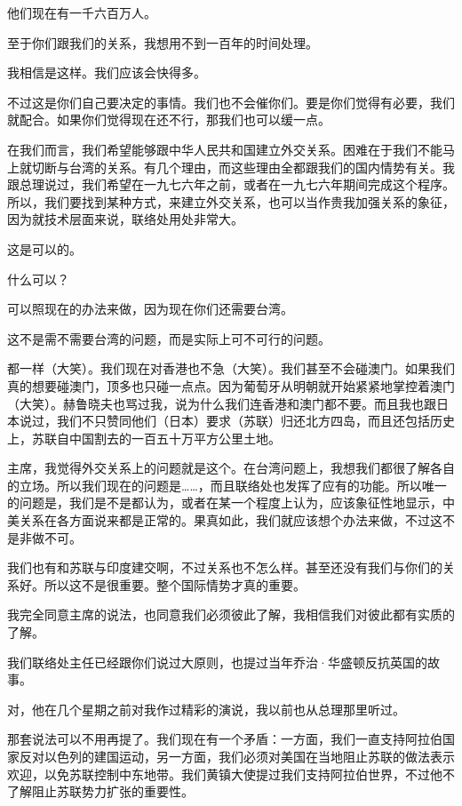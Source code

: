 他们现在有一千六百万人。

至于你们跟我们的关系，我想用不到一百年的时间处理。

我相信是这样。我们应该会快得多。

不过这是你们自己要决定的事情。我们也不会催你们。要是你们觉得有必要，我们就配合。如果你们觉得现在还不行，那我们也可以缓一点。

在我们而言，我们希望能够跟中华人民共和国建立外交关系。困难在于我们不能马上就切断与台湾的关系。有几个理由，而这些理由全都跟我们的国内情势有关。我跟总理说过，我们希望在一九七六年之前，或者在一九七六年期间完成这个程序。所以，我们要找到某种方式，来建立外交关系，也可以当作贵我加强关系的象征，因为就技术层面来说，联络处用处非常大。

这是可以的。

什么可以？

可以照现在的办法来做，因为现在你们还需要台湾。

这不是需不需要台湾的问题，而是实际上可不可行的问题。

都一样（大笑）。我们现在对香港也不急（大笑）。我们甚至不会碰澳门。如果我们真的想要碰澳门，顶多也只碰一点点。因为葡萄牙从明朝就开始紧紧地掌控着澳门（大笑）。赫鲁晓夫也骂过我，说为什么我们连香港和澳门都不要。而且我也跟日本说过，我们不只赞同他们（日本）要求（苏联）归还北方四岛，而且还包括历史上，苏联自中国割去的一百五十万平方公里土地。

主席，我觉得外交关系上的问题就是这个。在台湾问题上，我想我们都很了解各自的立场。所以我们现在的问题是……，而且联络处也发挥了应有的功能。所以唯一的问题是，我们是不是都认为，或者在某一个程度上认为，应该象征性地显示，中美关系在各方面说来都是正常的。果真如此，我们就应该想个办法来做，不过这不是非做不可。

我们也有和苏联与印度建交啊，不过关系也不怎么样。甚至还没有我们与你们的关系好。所以这不是很重要。整个国际情势才真的重要。

我完全同意主席的说法，也同意我们必须彼此了解，我相信我们对彼此都有实质的了解。

我们联络处主任已经跟你们说过大原则，也提过当年乔治·华盛顿反抗英国的故事。

对，他在几个星期之前对我作过精彩的演说，我以前也从总理那里听过。

那套说法可以不用再提了。我们现在有一个矛盾：一方面，我们一直支持阿拉伯国家反对以色列的建国运动，另一方面，我们必须对美国在当地阻止苏联的做法表示欢迎，以免苏联控制中东地带。我们黄镇大使提过我们支持阿拉伯世界，不过他不了解阻止苏联势力扩张的重要性。

